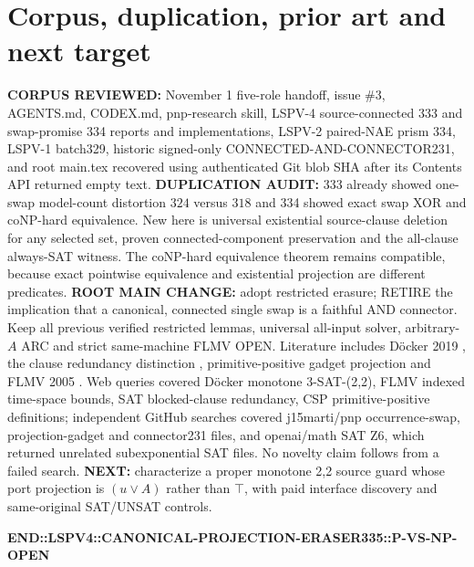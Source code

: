 \documentclass[11pt]{article}
\begin{document}
\section{Corpus, duplication, prior art and next target}
\textbf{CORPUS REVIEWED:} November 1 five-role handoff, issue \#3, AGENTS.md, CODEX.md, pnp-research skill, LSPV-4 source-connected 333 and swap-promise 334 reports and implementations, LSPV-2 paired-NAE prism 334, LSPV-1 batch329, historic signed-only CONNECTED-AND-CONNECTOR231, and root main.tex recovered using authenticated Git blob SHA after its Contents API returned empty text. \textbf{DUPLICATION AUDIT:} 333 already showed one-swap model-count distortion $324$ versus $318$ and 334 showed exact swap XOR and coNP-hard equivalence. New here is universal existential source-clause deletion for any selected set, proven connected-component preservation and the all-clause always-SAT witness. The coNP-hard equivalence theorem remains compatible, because exact pointwise equivalence and existential projection are different predicates. \textbf{ROOT MAIN CHANGE:} adopt restricted erasure; RETIRE the implication that a canonical, connected single swap is a faithful AND connector. Keep all previous verified restricted lemmas, universal all-input solver, arbitrary-$A$ ARC and strict same-machine FLMV OPEN.
Literature includes D\"ocker 2019 \cite{docker2019}, the clause redundancy distinction \cite{kiesl2017}, primitive-positive gadget projection \cite{pp2026} and FLMV 2005 \cite{flmv2005}. Web queries covered D\"ocker monotone 3-SAT-(2,2), FLMV indexed time-space bounds, SAT blocked-clause redundancy, CSP primitive-positive definitions; independent GitHub searches covered j15marti/pnp occurrence-swap, projection-gadget and connector231 files, and openai/math SAT Z6, which returned unrelated subexponential SAT files. No novelty claim follows from a failed search. \textbf{NEXT:} characterize a proper monotone 2,2 source guard whose port projection is $(u\lor A)$ rather than $\top$, with paid interface discovery and same-original SAT/UNSAT controls.


\noindent\textbf{END::LSPV4::CANONICAL-PROJECTION-ERASER335::P-VS-NP-OPEN}
\end{document}
